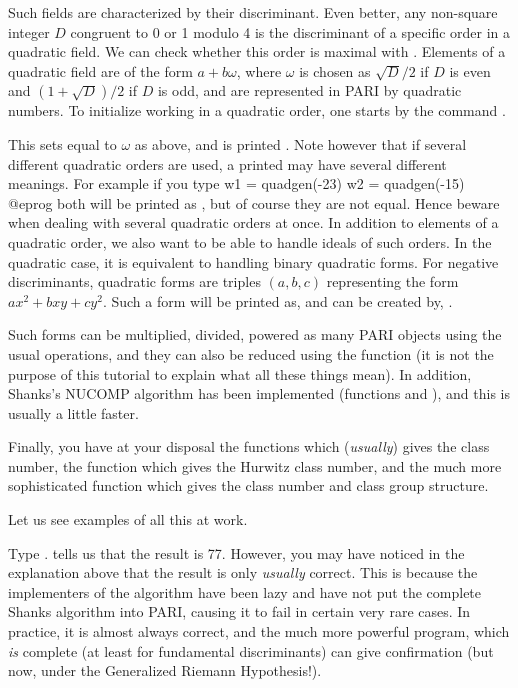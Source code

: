 Such fields are characterized by their discriminant. Even better, any
non-square integer $D$ congruent to 0 or 1 modulo 4 is the discriminant of a
specific order in a quadratic field. We can check whether this order is
maximal with . Elements of a quadratic field are of the
form $a+b\omega$, where $\omega$ is chosen as $\sqrt{D}/2$ if $D$ is even and
$(1+\sqrt{D})/2$ if $D$ is odd, and are represented in PARI by quadratic
numbers. To initialize working in a quadratic order, one starts by the
command .

This sets  equal to $\omega$ as above, and is printed . Note
however that if several different quadratic orders are used, a printed 
may have several different meanings. For example if you type
\bprog
  w1 = quadgen(-23)
  w2 = quadgen(-15)
@eprog\noindent
both will be printed as , but of course they are not equal. Hence
beware when dealing with several quadratic orders at once. \smallskip
%
In addition to elements of a quadratic order, we also want to be able to
handle ideals of such orders. In the quadratic case, it is equivalent to
handling binary quadratic forms. For negative discriminants, quadratic forms
are triples $(a,b,c)$ representing the form $ax^2+bxy+cy^2$. Such a form will
be printed as, and can be created by, .

Such forms can be multiplied, divided, powered as many PARI objects using
the usual operations, and they can also be reduced using the function
 (it is not the purpose of this tutorial to explain what all
these things mean). In addition, Shanks's NUCOMP algorithm has been
implemented (functions  and ), and this is
usually a little faster.

Finally, you have at your disposal the functions  which
(\emph{usually}) gives the class number, the function 
which gives the Hurwitz class number, and the much more sophisticated
 function which gives the class number and class group
structure.

Let us see examples of all this at work.

Type .  tells us that the result is 77. However,
you may have noticed in the explanation above that the result is only
\emph{usually} correct. This is because the implementers of the algorithm
have been lazy and have not put the complete Shanks algorithm into PARI,
causing it to fail in certain very rare cases. In practice, it is almost
always correct, and the much more powerful  program, which
\emph{is} complete (at least for fundamental discriminants) can give
confirmation (but now, under the Generalized Riemann Hypothesis!).

